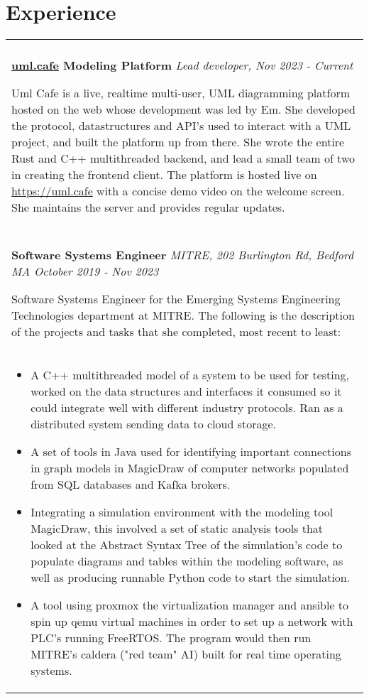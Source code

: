 \documentclass[11pt]{article}
\begin{document}
\section*{Experience}
\begin{tabular}{p{18.5cm}}
    \hline
    \multicolumn{1}{c}{} \\

     \large \textbf{\href{https://uml.cafe}{uml.cafe} Modeling Platform} \normalsize \textit{Lead developer, \hfill Nov 2023 - Current}

     \> Uml Cafe is a live, realtime multi-user, UML diagramming platform hosted on the web whose development was led 
     by Em. She developed the protocol, datastructures and API's used to interact with a UML project, and built the platform up from there. She wrote the
     entire Rust and C++ multithreaded backend, and lead a small team of two in creating the frontend client. The platform is hosted live on 
     \url{https://uml.cafe} with a concise demo video on the welcome screen. She maintains the server and provides regular updates.\\
 
     \multicolumn{1}{c}{} \\

    \large \textbf{Software Systems Engineer} \normalsize \textit{MITRE, 202 Burlington Rd, Bedford MA \hfill October 2019 - Nov 2023}

    \> Software Systems Engineer for the Emerging Systems Engineering Technologies department at MITRE. The following is the 
    description of the projects and tasks that she completed, most recent to least:\\ 

    \begin{itemize}[noitemsep,topsep=0pt]
      \item A C++ multithreaded model of a system to be used for testing, worked on the data structures and interfaces it consumed so it could 
      integrate well with different industry protocols. Ran as a distributed system sending data to cloud storage.
      \item A set of tools in Java used for identifying important connections in graph models in MagicDraw of computer networks populated from SQL 
      databases and Kafka brokers.
      \item Integrating a simulation environment with the modeling tool MagicDraw, this involved a set of static analysis tools that looked at the Abstract Syntax Tree 
      of the simulation's code to populate diagrams and tables within the modeling software, as well as producing runnable Python code to start the simulation.
      \item A tool using proxmox the virtualization manager and ansible to spin up qemu virtual machines in order to set up a network with PLC's running FreeRTOS.
      The program would then run MITRE's caldera ("red team" AI) built for real time operating systems.
    \end{itemize}\\


\end{tabular}
\end{document}
